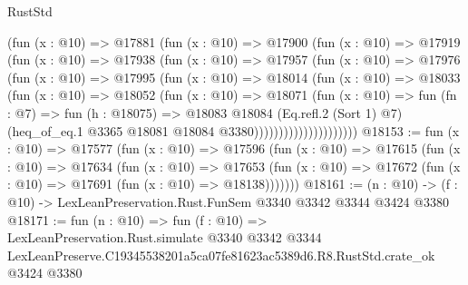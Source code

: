\begin{lexlean}{RustStd}
\begin{coremodule}
                    (fun (x : @10) =>
                    @17881
                      (fun (x : @10) =>
                      @17900
                        (fun (x : @10) =>
                        @17919
                          (fun (x : @10) =>
                          @17938
                            (fun (x : @10) =>
                            @17957
                              (fun (x : @10) =>
                              @17976
                                (fun (x : @10) =>
                                @17995
                                  (fun (x : @10) =>
                                  @18014
                                    (fun (x : @10) =>
                                    @18033
                                      (fun (x : @10) =>
                                      @18052
                                        (fun (x : @10) =>
                                        @18071
                                          (fun (x : @10) =>
                                          fun (fn : @7) =>
                                          fun (h : @18075) =>
                                          @18083
                                            @18084
                                            (Eq.refl.{2} (Sort 1) @7)
                                            (heq_of_eq.{1}
                                              @3365
                                              @18081
                                              @18084
                                              @3380)))))))))))))))))))))
@18153 := fun (x : @10) =>
  @17577
    (fun (x : @10) =>
    @17596
      (fun (x : @10) =>
      @17615
        (fun (x : @10) =>
        @17634
          (fun (x : @10) =>
          @17653 (fun (x : @10) => @17672 (fun (x : @10) => @17691 (fun (x : @10) => @18138)))))))
@18161 := (n : @10) -> (f : @10) -> LexLeanPreservation.Rust.FunSem @3340 @3342 @3344 @3424 @3380
@18171 := fun (n : @10) =>
  fun (f : @10) =>
  LexLeanPreservation.Rust.simulate
    @3340
    @3342
    @3344
    LexLeanPreserve.C19345538201a5ca07fe81623ac5389d6.R8.RustStd.crate_ok
    @3424
    @3380
\end{coremodule}
\end{lexlean}
